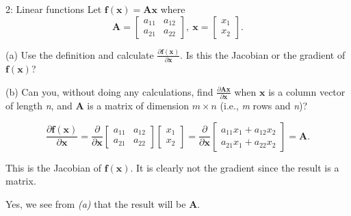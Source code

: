

\begin{problem}{2: Linear functions}
Let $\mathbf{f(x)} = \mathbf{Ax}$ where
\[
  \mathbf{A} =
  \begin{bmatrix}
    a_{11} & a_{12} \\
    a_{21} & a_{22}
  \end{bmatrix}
  ,\
  \mathbf{x} =
  \begin{bmatrix}
    x_1 \\ x_2
  \end{bmatrix}
  .\]

(a) Use the definition and calculate $\frac{\partial\mathbf{f(x)}}{\partial\mathbf{x}}$. Is this the Jacobian or the gradient of $\mathbf{f(x)}$?

\medskip

(b) Can you, without doing any calculations, find $\frac{\partial\mathbf{Ax}}{\partial\mathbf{x}}$ when $\mathbf{x}$ is a
column vector of length \textit{n}, and $\mathbf{A}$ is a matrix of dimension $m\times n$ (i.e., \textit{m} rows and \textit{n})?
\end{problem}



\[
  \frac{\partial\mathbf{f}(\mathbf{x})}{\partial \mathbf{x}} = \frac{\partial}{\partial \mathbf{x}} \begin{bmatrix}
    a_{11} & a_{12} \\ a_{21} & a_{22}
  \end{bmatrix} \begin{bmatrix}
    x_1 \\ x_2
  \end{bmatrix} = \frac{\partial}{\partial \mathbf{x}} \begin{bmatrix}
    a_{11}x_1 + a_{12}x_2 \\ a_{21}x_1 + a_{22}x_2
  \end{bmatrix} = \mathbf{A}
.\] 

This is the Jacobian of $\mathbf{f}(\mathbf{x})$. It is clearly not the gradient since the result is a matrix.


Yes, we see from \textit{(a)} that the result will be $\mathbf{A}$.